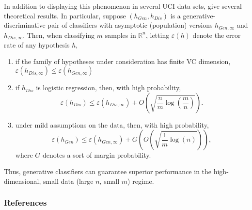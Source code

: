 \documentclass{article} %
\newcommand{\R}{\mathbb{R}}                         %
\newcommand{\e}{\varepsilon}                        %
\begin{document}
In addition to displaying this phenomenon in several UCI data sets,
\citet{ng02discVsGen} give several theoretical results. In particular, suppose
$(h_{Gen},h_{Dis})$ is a generative-discriminative pair of classifiers with
asymptotic (population) versions $h_{Gen,\infty}$ and $h_{Dis,\infty}$. Then,
when classifying $m$ samples in $\R^n$, letting $\e(h)$ denote the error rate
of any hypothesis $h$,
\begin{enumerate}
\item if the family of hypotheses under consideration has finite VC dimension,
$\e(h_{Dis,\infty}) \leq \e(h_{Gen,\infty})$
\item if $h_{Dis}$ is logistic regression, then, with high probability,
\[\e(h_{Dis})
    \leq \e(h_{Dis,\infty})
        + O\left( \sqrt{\frac{n}{m} \log\left( \frac{m}{n} \right)} \right).\]
\item under mild assumptions on the data, then, with high probability,
\[\e(h_{Gen})
    \leq \e(h_{Gen,\infty})
        + G\left( O\left( \sqrt{\frac{1}{m} \log(n)} \right) \right),\]
where $G$ denotes a sort of margin probability.
\end{enumerate}
Thus, generative classifiers can guarantee superior performance in the
high-dimensional, small data (large $n$, small $m$) regime.

\subsubsection*{References}
\setlength{\bibsep}{0.0pt}
{


}
\end{document}
